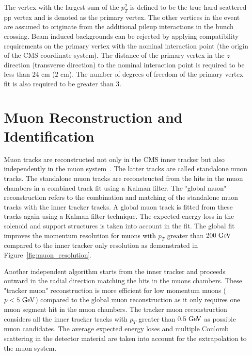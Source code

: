 The vertex with the largest sum of the $p_{T}^2$ is defined to be the true hard-scattered pp vertex and is denoted as the primary vertex. The other vertices in the event are assumed to originate from the additional pileup interactions in the bunch crossing. Beam induced backgrounds can be rejected by applying compatibility requirements on the primary vertex with the nominal interaction point (the origin of the CMS coordinate system). The distance of the primary vertex in the $z$ direction (transverse direction) to the nominal interaction point is required to be less than $24$ cm ($2$ cm). The number of degrees of freedom of the primary vertex fit is also required to be greater than $3$.

\section{Muon Reconstruction and Identification}

Muon tracks are reconstructed not only in the CMS inner tracker but also independently in the muon system~\cite{Chatrchyan:2012xi}. The latter tracks are called standalone muon tracks. The standalone muon tracks are reconstructed from the hits in the muon chambers in a combined track fit using a Kalman filter. The "global muon" reconstruction refers to the combination and matching of the standalone muon tracks with the inner tracker tracks. A global muon track is fitted from these tracks again using a Kalman filter technique. The expected energy loss in the solenoid and support structures is taken into account in the fit. The global fit improves the momentum resolution for muons with $p_{T}$ greater than $200~\mathrm{Ge\kern -0.1em V}$ compared to the inner tracker only resolution as demonstrated in Figure~\ref{fig:muon_resolution}.   

Another independent algorithm starts from the inner tracker and proceeds outward in the radial direction matching the hits in the muons chambers. These "tracker muon" reconstruction is more efficient for low momentum muons ($p < 5~\mathrm{Ge\kern -0.1em V}$) compared to the global muon reconstruction as it only requires one muon segment hit in the muon chambers. The tracker muon reconstruction considers all the inner tracker tracks with $p_{T}$ greater than $0.5~\mathrm{Ge\kern -0.1em V}$ as possible muon candidates. The average expected energy loses and multiple Coulomb scattering in the detector material are taken into account for the extrapolation to the muon system. 

